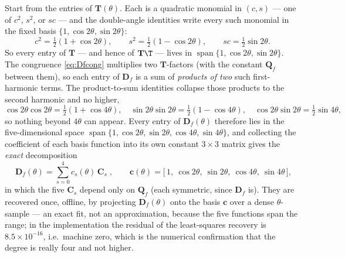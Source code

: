 \documentclass[11pt]{article}
\begin{document}
Start from the entries of $\mathbf T(\theta)$. Each is a quadratic monomial in
$(c,s)$ --- one of $c^2$, $s^2$, or $sc$ --- and the double-angle identities write
every such monomial in the fixed basis $\{1,\cos2\theta,\sin2\theta\}$:
\begin{equation}
  c^2=\tfrac12(1+\cos2\theta),\qquad
  s^2=\tfrac12(1-\cos2\theta),\qquad
  sc=\tfrac12\sin2\theta .
  \label{eq:double}
\end{equation}
So every entry of $\mathbf T$ --- and hence of $\mathbf T\T$ --- lives in
$\operatorname{span}\{1,\cos2\theta,\sin2\theta\}$. The congruence
\eqref{eq:Dfcong} multiplies two $\mathbf T$-factors (with the constant $\mathbf
Q_f$ between them), so each entry of $\mathbf D_f$ is a sum of \emph{products of two}
such first-harmonic terms. The product-to-sum identities collapse those products to
the second harmonic and no higher,
\begin{equation}
  \cos2\theta\cos2\theta=\tfrac12(1+\cos4\theta),\quad
  \sin2\theta\sin2\theta=\tfrac12(1-\cos4\theta),\quad
  \cos2\theta\sin2\theta=\tfrac12\sin4\theta ,
\end{equation}
so nothing beyond $4\theta$ can appear. Every entry of $\mathbf D_f(\theta)$ therefore
lies in the five-dimensional space
$\operatorname{span}\{1,\cos2\theta,\sin2\theta,\cos4\theta,\sin4\theta\}$, and
collecting the coefficient of each basis function into its own constant $3\times3$
matrix gives the \emph{exact} decomposition
\begin{equation}
  \boxed{\;\mathbf D_f(\theta)=\sum_{s=0}^{4}c_s(\theta)\,\mathbf C_s\;},\qquad
  \mathbf c(\theta)=\bigl[\,1,\ \cos2\theta,\ \sin2\theta,\ \cos4\theta,\ \sin4\theta\,\bigr],
  \label{eq:dffourier}
\end{equation}
in which the five $\mathbf C_s$ depend only on $\mathbf Q_f$ (each symmetric, since
$\mathbf D_f$ is). They are recovered once, offline, by projecting $\mathbf
D_f(\theta)$ onto the basis $\mathbf c$ over a dense $\theta$-sample --- an exact fit,
not an approximation, because the five functions span the range; in the
implementation the residual of the least-squares recovery is
$8.5\times10^{-16}$, i.e.\ machine zero, which is the numerical confirmation that the
degree is really four and not higher.
\end{document}
